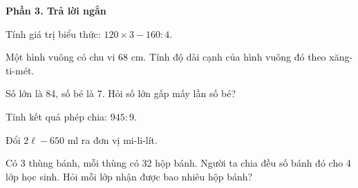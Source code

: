 \textbf{Phần 3. Trả lời ngắn}

\begin{ex} %
Tính giá trị biểu thức: $120 \times 3 - 160 : 4$.
\end{ex}

\begin{ex} %
Một hình vuông có chu vi $68\text{ cm}$. Tính độ dài cạnh của hình vuông đó theo xăng-ti-mét.
\end{ex}

\begin{ex} %
Số lớn là 84, số bé là 7. Hỏi số lớn gấp mấy lần số bé?
\end{ex}

\begin{ex} %
Tính kết quả phép chia: $945 : 9$.
\end{ex}

\begin{ex} %
Đổi $2\ell - 650\text{ ml}$ ra đơn vị mi-li-lít.
\end{ex}

\begin{ex} %
Có 3 thùng bánh, mỗi thùng có 32 hộp bánh. Người ta chia đều số bánh đó cho 4 lớp học sinh. Hỏi mỗi lớp nhận được bao nhiêu hộp bánh?
\end{ex}
